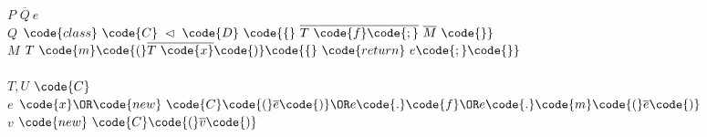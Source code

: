 \newcommand{\nnnC}{\code{C}}
\newcommand{\nnne}{e}
\newcommand{\nnnD}{\code{D}}
\newcommand{\nnnG}{\Gamma}
\newcommand{\nnnf}{\code{f}}
\newcommand{\nnnthis}{\code{this}}
\newcommand{\nnnm}{\code{m}}
\newcommand{\nnnObject}{\code{Object}}
\newcommand{\nnnM}{M}
\newcommand{\nnnPP}{\mathcal{P}}
\newcommand{\nnnQ}{Q}
\newcommand{\nnnP}{P}
\newcommand{\nnnext}{\extends}
\newcommand{\nnnU}{U}
\newcommand{\nnnT}{T}
\newcommand{\nnnv}{v}
\newcommand{\nnny}{\code{y}}
\newcommand{\nnnx}{\code{x}}
\newcommand{\nnnz}{\code{z}}
\newcommand{\nnnLANGLE}{\code{(}}
\newcommand{\nnnRANGLE}{\code{)}}

\newcommand{\nnjmBody}[4]{mBody({#1}, {#2}) = {#3};{#4}}
\newcommand{\nnjmcheck}[3]{{#1} \vdash {#3} \inn {#2}}
\newcommand{\nnjwf}[1]{\vdash {#1} \ok}
\newcommand{\nnjfields}[3]{fields({#1}) = {#2};{#3}}
\newcommand{\nnjtcheck}[3]{{#1} \vdash {#2} : {#3}}
\newcommand{\nnjpcheck}[1]{\vdash {#1}}
\newcommand{\nnjccheck}[1]{\vdash {#1}}
\newcommand{\nnjmType}[4]{mType({#1}, {#2}) = {#3};{#4}}
\newcommand{\nnjsubtype}[2]{\vdash {#1} <: {#2}}
\newcommand{\nnjfType}[3]{fType({#1}, {#2}) = {#3}}
\newcommand{\nnjoverride}[4]{override_{}({#1}, {#2}, {#3}, {#4})}





\newcommand{\redArrow}{\leadsto}

\newcommand{\ok}{\mbox{ \sc ok}}

\newcommand{\inn}{\mbox{ \sc in}}

\newcommand{\extends}{\lhd}

\startSyntaxFig

$\nnnP $\>\bbc\> $\overline{\nnnQ} \ \nnne $\>\\
$\nnnQ $\>\bbc\> $\code{class} \ \nnnC \ \nnnext \ \nnnD \ \code{\{} \ \overline{\nnnT \ \nnnf \code{;}} \ \overline{\nnnM} \ \code{\}} $\>\\
$\nnnM $\>\bbc\> $\nnnT \ \nnnm \nnnLANGLE \overline{\nnnT \ \nnnx} \nnnRANGLE \code{\{} \ \code{return} \ \nnne \code{;} \code{\}} $\>\\
\\

$\nnnT, \nnnU $\>\bbc\> $\nnnC $\>\\
$\nnne $\>\bbc\> $\nnnx \OR \code{new} \ \nnnC \nnnLANGLE \overline{\nnne} \nnnRANGLE \OR \nnne \code{.} \nnnf \OR \nnne \code{.} \nnnm \nnnLANGLE \overline{\nnne} \nnnRANGLE $\>\\
$\nnnv $\>\bbc\> $\code{new} \ \nnnC \nnnLANGLE \overline{\nnnv} \nnnRANGLE $\>\\
\\

